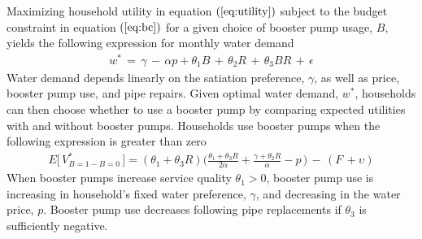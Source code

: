 \documentclass[12pt,table]{article}
\begin{document}

Maximizing household utility in equation $(\ref{eq:utility})$ subject to the budget constraint in equation $(\ref{eq:bc})$ for a given choice of booster pump usage, $B$, yields the following expression for monthly water demand
\begin{align}
w^{*} \, = \, \gamma \, - \, \alpha p +  \theta_1 B \, + \, \theta_2 R  \,+ \, \theta_3 B R \,  + \, \epsilon
\end{align}
Water demand depends linearly on the satiation preference, $\gamma$, as well as price, booster pump use, and pipe repairs.  Given optimal water demand, $w^{*}$, households can then choose whether to use a booster pump by comparing expected utilities with and without booster pumps.  Households use booster pumps when the following expression is greater than zero
\begin{align}
E\Big[ \,V_{B=1 - B=0}^{*}\,\Big]  = (\theta_1 + \theta_3 R) \Big(  \frac{\theta_1 + \theta_3 R}{2\alpha} + \frac{\gamma +  \theta_2 R}{\alpha} - p  \, \Big) \, - \, (F \, + \upsilon)
\end{align}
When booster pumps increase service quality $\theta_1>0$, booster pump use is increasing in household's fixed water preference, $\gamma$, and decreasing in the water price, $p$.  Booster pump use decreases following pipe replacements if $\theta_3$ is sufficiently negative.  
\end{document}

